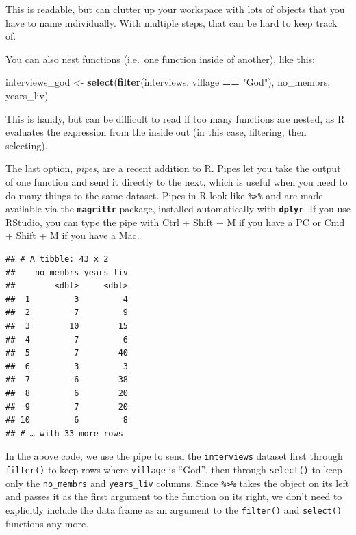 \documentclass[]{book}
\newenvironment{Shaded}{\begin{snugshade}}{\end{snugshade}}
\newcommand{\KeywordTok}[1]{\textcolor[rgb]{0.13,0.29,0.53}{\textbf{#1}}}
\newcommand{\StringTok}[1]{\textcolor[rgb]{0.31,0.60,0.02}{#1}}
\newcommand{\OperatorTok}[1]{\textcolor[rgb]{0.81,0.36,0.00}{\textbf{#1}}}
\newcommand{\NormalTok}[1]{#1}
\begin{document}
This is readable, but can clutter up your workspace with lots of objects
that you have to name individually. With multiple steps, that can be
hard to keep track of.

You can also nest functions (i.e.~one function inside of another), like
this:

\begin{Shaded}
\begin{Highlighting}[]
\NormalTok{interviews_god <-}\StringTok{ }\KeywordTok{select}\NormalTok{(}\KeywordTok{filter}\NormalTok{(interviews, village }\OperatorTok{==}\StringTok{ "God"}\NormalTok{), no_membrs, years_liv)}
\end{Highlighting}
\end{Shaded}

This is handy, but can be difficult to read if too many functions are
nested, as R evaluates the expression from the inside out (in this case,
filtering, then selecting).

The last option, \emph{pipes}, are a recent addition to R. Pipes let you
take the output of one function and send it directly to the next, which
is useful when you need to do many things to the same dataset. Pipes in
R look like \texttt{\%\textgreater{}\%} and are made available via the
\textbf{\texttt{magrittr}} package, installed automatically with
\textbf{\texttt{dplyr}}. If you use RStudio, you can type the pipe with
Ctrl + Shift + M if you have a PC or Cmd + Shift + M if you have a Mac.

\begin{Shaded}
\end{Shaded}

\begin{verbatim}
## # A tibble: 43 x 2
##    no_membrs years_liv
##        <dbl>     <dbl>
##  1         3         4
##  2         7         9
##  3        10        15
##  4         7         6
##  5         7        40
##  6         3         3
##  7         6        38
##  8         6        20
##  9         7        20
## 10         6         8
## # … with 33 more rows
\end{verbatim}

In the above code, we use the pipe to send the \texttt{interviews}
dataset first through \texttt{filter()} to keep rows where
\texttt{village} is ``God'', then through \texttt{select()} to keep only
the \texttt{no\_membrs} and \texttt{years\_liv} columns. Since
\texttt{\%\textgreater{}\%} takes the object on its left and passes it
as the first argument to the function on its right, we don't need to
explicitly include the data frame as an argument to the
\texttt{filter()} and \texttt{select()} functions any more.
\end{document}
